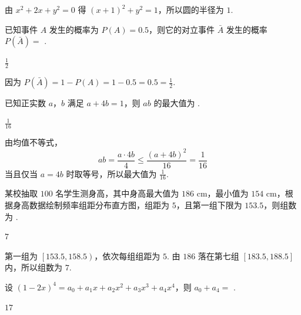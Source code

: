 \begin{solution}
由 \(x^2+2x+y^2=0\) 得 \(\left(x+1\right)^2+y^2=1\)，所以圆的半径为 \(1\).
\end{solution}

\begin{problem}
已知事件 \(A\) 发生的概率为 \(P(A)=0.5\)，则它的对立事件 \(\bar{A}\) 发生的概率 \(P(\bar{A})=\)\fillinblank{} .
\end{problem}

\begin{answer}
\(\frac{1}{2}\)
\end{answer}

\begin{solution}
因为 \(P(\bar{A})=1-P(A)=1-0.5=0.5=\frac12\).
\end{solution}

\begin{problem}
已知正实数 \(a\)，\(b\) 满足 \(a+4b=1\)，则 \(ab\) 的最大值为\fillinblank{} .
\end{problem}

\begin{answer}
\(\frac{1}{16}\)
\end{answer}

\begin{solution}
由均值不等式，
\[
ab=\frac{a\cdot 4b}{4}\le \frac{\left(a+4b\right)^2}{16}=\frac{1}{16}
\]
当且仅当 \(a=4b\) 时取等号，所以最大值为 \(\frac{1}{16}\).
\end{solution}

\begin{problem}
某校抽取 \(100\) 名学生测身高，其中身高最大值为 \(186\) cm，最小值为 \(154\) cm，根据身高数据绘制频率组距分布直方图，组距为 \(5\)，且第一组下限为 \(153.5\)，则组数为\fillinblank{} .
\end{problem}

\begin{answer}
\(7\)
\end{answer}

\begin{solution}
第一组为 \(\left[153.5,158.5\right)\)，依次每组组距为 \(5\). 由 \(186\) 落在第七组 \(\left[183.5,188.5\right]\) 内，所以组数为 \(7\).
\end{solution}

\begin{problem}
设 \(\left(1-2x\right)^4=a_0+a_1x+a_2x^2+a_3x^3+a_4x^4\)，则 \(a_0+a_4=\)\fillinblank{} .
\end{problem}

\begin{answer}
\(17\)
\end{answer}

